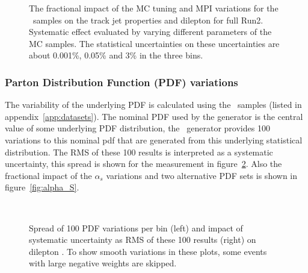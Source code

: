 \begin{figure}[h!]
  \caption{The fractional impact of the MC tuning and MPI variations for the \pythia~samples on the track jet properties and dilepton \pt for full Run2. Systematic effect evaluated by varying different parameters of the MC samples. The statistical uncertainties on these uncertainties are about 0.001\%, 0.05\% and 3\% in the three bins.}
  \label{fig:PS_MPI}
\end{figure}

\subsubsection{Parton Distribution Function (PDF) variations}
The variability of the underlying PDF is calculated using the \sherpa~samples (listed in appendix~\ref{app:datasets}). The nominal PDF used by the generator is the central value of some underlying PDF distribution, the \sherpa~generator provides 100 variations to this nominal pdf that are generated from this underlying statistical distribution.  The RMS of these 100 results is interpreted as a systematic uncertainty, this spread is shown for the measurement in figure~\ref{fig:PDF_RMS}. Also the fractional impact of the $\alpha_{s}$ variations and two alternative PDF sets is shown in figure~\ref{fig:alpha_S}.
\begin{figure}[h!]
  \centering
   \\
  \caption{Spread of 100 PDF variations per bin (left) and impact of systematic uncertainty as RMS of these 100 results (right) on dilepton \pt. To show smooth variations in these plots, some events with large negative weights are skipped.}
  \label{fig:PDF_RMS}
\end{figure}

